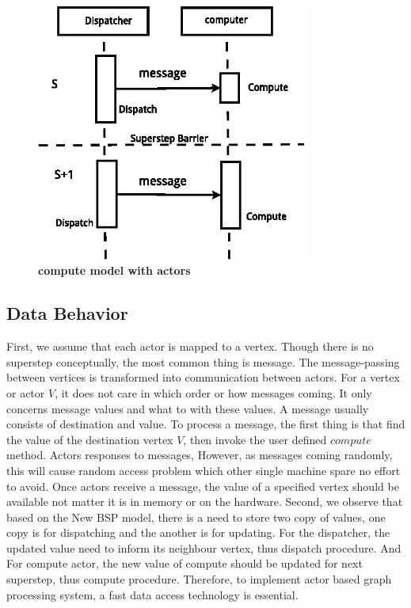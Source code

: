 \documentclass[twocolumn,a4paper,10pt]{article}
\begin{document}
\begin{figure}[htbp]

\begin{minipage}[]{0.5\textwidth}
	\centering
     \includegraphics[width=0.8\textwidth,angle=0]{figure/computemodel.eps}
\end{minipage}
    \caption{\textbf{compute model with actors}}
    \label{figure:computemodel}
\end{figure}




\subsection{Data Behavior}

First, we assume that each actor is mapped to a vertex. Though there is no superstep conceptually, the most common thing is message. The message-passing between vertices is transformed into communication between actors. For a vertex or actor $V$, it does not care in which order or how messages coming. It only concerns message values and what to with these values. A message usually consists of destination and value. To process a message, the first thing is that find the value of the destination vertex $V$, then invoke the user defined $compute$ method. Actors responses to messages, However, as messages coming randomly, this will cause random access problem which other single machine spare no effort to avoid. Once actors receive a message, the value of a specified vertex should be available not matter it is in memory or on the hardware. 
Second, we observe that based on the New BSP model, there is a need to store two copy of values, one copy is for dispatching and the another is for updating. For the dispatcher, the updated value need to inform its neighbour vertex, thus dispatch procedure. And For compute actor, the new value of compute should be updated for next superstep, thus compute procedure. Therefore, to implement actor based graph processing system, a fast data access technology is essential. 
\end{document}

